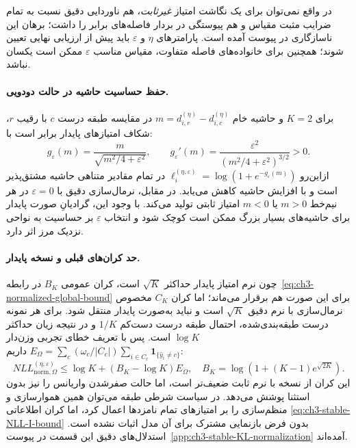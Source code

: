 در واقع نمی‌توان برای یک نگاشت امتیاز
\emph{غیرثابت}، هم ناوردایی دقیق نسبت
به تمام ضرایب مثبت مقیاس و هم
پیوستگی در بردار فاصله‌های برابر را
داشت؛ برهان این ناسازگاری در پیوست آمده است.
پارامترهای $\eta$ و $\varepsilon$
باید پیش از ارزیابی نهایی تعیین شوند؛
همچنین برای خانواده‌های فاصله متفاوت،
مقیاس مناسب $\varepsilon$ ممکن است
یکسان نباشد.


\paragraph{حفظ حساسیت حاشیه در حالت دودویی.}
برای $K=2$ و حاشیه خام
$m=d_{i,r}^{(\eta)}-d_{i,c}^{(\eta)}$
در مقایسه طبقه درست $c$ با رقیب $r$،
شکاف امتیازهای پایدار برابر است با:
\begin{equation}\label{eq:ch3-stable-binary-margin}
g_\varepsilon(m)
=\frac{m}{\sqrt{m^2/4+\varepsilon^2}},
\qquad
g_\varepsilon'(m)
=\frac{\varepsilon^2}
{(m^2/4+\varepsilon^2)^{3/2}}>0.
\end{equation}
ازاین‌رو
$\ell_i^{(\eta,\varepsilon)}
=\log(1+e^{-g_\varepsilon(m)})$
در تمام مقادیر متناهی حاشیه مشتق‌پذیر
است و با افزایش حاشیه کاهش می‌یابد.
در مقابل، نرمال‌سازی دقیق با
$\varepsilon=0$ در هر نیم‌خط
$m>0$ یا $m<0$ امتیاز ثابتی تولید
می‌کند. با وجود این، گرادیانِ
صورت پایدار برای حاشیه‌های
بسیار بزرگ ممکن است کوچک شود
و انتخاب $\varepsilon$ بر
حساسیت به نواحی نزدیک مرز اثر دارد.

\paragraph{حد کران‌های قبلی و نسخه پایدار.}
چون نرم امتیاز پایدار حداکثر $\sqrt K$
است، کران عمومی $B_K$ در
رابطه~\eqref{eq:ch3-normalized-global-bound}
برای این صورت هم برقرار می‌ماند؛
اما کران $C_K$ مخصوص نرمال‌سازی
با نرم دقیق $\sqrt K$ است و
نباید به‌صورت پایدار منتقل شود.
برای هر نمونه درست طبقه‌بندی‌شده،
احتمال طبقه درست دست‌کم $1/K$
و در نتیجه زیان حداکثر $\log K$ است.
پس با تعریف خطای تجربی وزن‌دار
$E_\Omega=\sum_c(\omega_c/|C_c|)
\sum_{i\in C_c}\mathbf1_{\{\widehat y_i\ne c\}}$
داریم:
\begin{equation}\label{eq:ch3-stable-normalized-error-bound}
\boxed{
NLL_{\mathrm{norm},\Omega}^{(\eta,\varepsilon)}
\le\log K+(B_K-\log K)E_\Omega,
\quad B_K=\log(1+(K-1)e^{\sqrt{2K}}).
}
\end{equation}
این کران از نسخه با نرم ثابت ضعیف‌تر است،
اما حالت صفرشدن واریانس را نیز
بدون استثنا پوشش می‌دهد.
در سیاست شرطی طبقه می‌توان همین
هموارسازی و منظم‌سازی را بر
امتیازهای تمام نامزدها اعمال کرد،
اما کران اطلاعاتی
\eqref{eq:ch3-stable-NLL-I-bound}
بدون فرض بازنمایی مشترک
برای آن مدل اثبات نشده است.
استدلال‌های دقیق این قسمت
در پیوست~\ref{app:ch3-stable-KL-normalization}
آمده‌اند.

